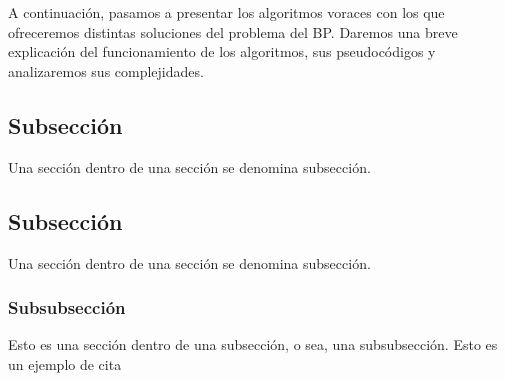 \documentclass[a4paper, 12pt, oneside]{book}
\begin{document}
	\noindent{}
	\\\\
	
	A continuaci\'on, pasamos a presentar los algoritmos voraces con los que ofreceremos distintas soluciones del problema del BP. Daremos una breve explicaci\'on del funcionamiento de los algoritmos, sus pseudoc\'odigos y analizaremos sus complejidades. 
	
	
	\subsection{Subsecci\'{o}n}
	Una secci\'{o}n dentro de una secci\'{o}n se denomina subsecci\'{o}n.
	\subsection{Subsecci\'{o}n}
	Una secci\'{o}n dentro de una secci\'{o}n se denomina subsecci\'{o}n.
	\subsubsection{Subsubsecci\'{o}n}
	Esto es una secci\'{o}n dentro de una subsecci\'{o}n, o sea, una subsubsecci\'{o}n.
	Esto es un ejemplo de cita \cite{Zfinitegrading}
	
	
	
	
	
	
\end{document}
